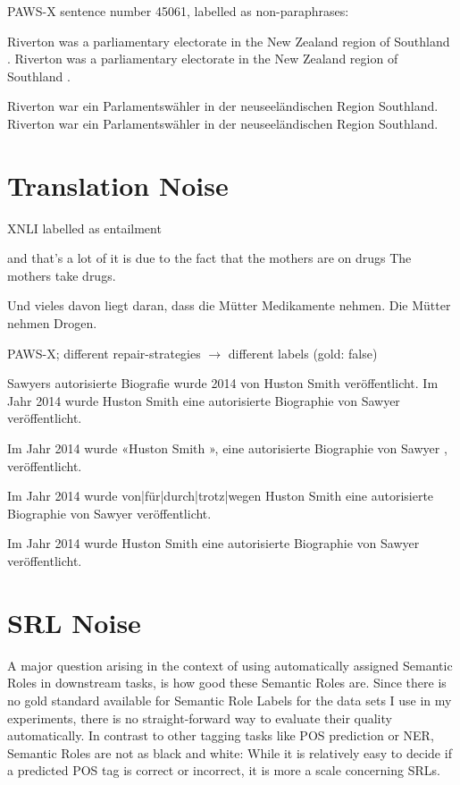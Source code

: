 PAWS-X sentence number 45061, labelled as non-paraphrases:

Riverton was a parliamentary electorate in the New Zealand region of Southland .
Riverton was a parliamentary electorate in the New Zealand region of Southland .

Riverton war ein Parlamentswähler in der neuseeländischen Region Southland.
Riverton war ein Parlamentswähler in der neuseeländischen Region Southland.

\section{Translation Noise}
\label{sec:translation-noise}

XNLI labelled as entailment

and that's a lot of it is due to the fact that the mothers are on drugs
The mothers take drugs.

Und vieles davon liegt daran, dass die Mütter Medikamente nehmen.
Die Mütter nehmen Drogen.

PAWS-X; different repair-strategies $\rightarrow$ different labels (gold: false)

Sawyers autorisierte Biografie wurde 2014 von Huston Smith veröffentlicht.
Im Jahr 2014 wurde Huston Smith eine autorisierte Biographie von Sawyer veröffentlicht.


Im Jahr 2014 wurde {\color{red} «}Huston Smith{\color{red} », } eine autorisierte Biographie von Sawyer{\color{red} ,} veröffentlicht.

Im Jahr 2014 wurde {\color{red} von|für|durch|trotz|wegen} Huston Smith eine autorisierte Biographie von Sawyer veröffentlicht.

Im Jahr 2014 wurde Huston Smith eine autorisierte Biographie von Sawyer veröffentlicht.


\section{SRL Noise}
\label{sec:srl-noise}

A major question arising in the context of using automatically assigned Semantic Roles in
downstream tasks, is how good these Semantic Roles are. Since there is no gold standard
available for Semantic Role Labels for the data sets I use in my experiments, there is no
straight-forward way to evaluate their quality {\color{red} automatically}. In contrast to
other tagging tasks like POS prediction or NER, Semantic Roles are not as black and white:
While it is relatively easy to decide if a predicted POS tag is correct or incorrect, it
is more a scale concerning SRLs.

